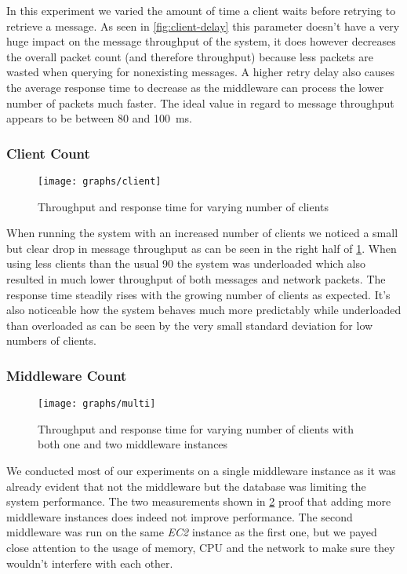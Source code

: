 \documentclass[a4paper, oneside]{csthesis}
\begin{document}
    In this experiment we varied the amount of time a client waits before retrying to retrieve a message.
    As seen in \cref{fig:client-delay} this parameter doesn't have a very huge impact on the message throughput
    of the system, it does however decreases the overall packet count (and therefore throughput) because
    less packets are wasted when querying for nonexisting messages. A higher retry delay also causes the
    average response time to decrease as the middleware can process the lower number of packets much faster.
    The ideal value in regard to message throughput appears to be between 80 and \SI{100}{\milli\second}.

\newpage
\subsubsection{Client Count}
    \begin{figure}[ht]
    \centering
        \texttt{[image: graphs/client]}
        \caption{Throughput and response time for varying number of clients}
        \label{fig:client}
    \end{figure}
    
    When running the system with an increased number of clients we noticed a small but clear drop in 
    message throughput as can be seen in the right half of \cref{fig:client}. When using less clients
    than the usual 90 the system was underloaded which also resulted in much lower throughput of both
    messages and network packets. The response time steadily rises with the growing number of clients
    as expected. It's also noticeable how the system behaves much more predictably while underloaded
    than overloaded as can be seen by the very small standard deviation for low numbers of clients.
    
\newpage
\subsubsection{Middleware Count}
    \begin{figure}[ht]
    \centering
        \texttt{[image: graphs/multi]}
        \caption{Throughput and response time for varying number of clients with both one and two middleware instances}
        \label{fig:multi}
    \end{figure}
    
    We conducted most of our experiments on a single middleware instance as it was already evident
    that not the middleware but the database was limiting the system performance. The two measurements
    shown in \cref{fig:multi} proof that adding more middleware instances does indeed not improve
    performance. The second middleware was run on the same {\it EC2} instance as the first one, but
    we payed close attention to the usage of memory, CPU and the network to make sure they wouldn't
    interfere with each other.
    
\end{document}
